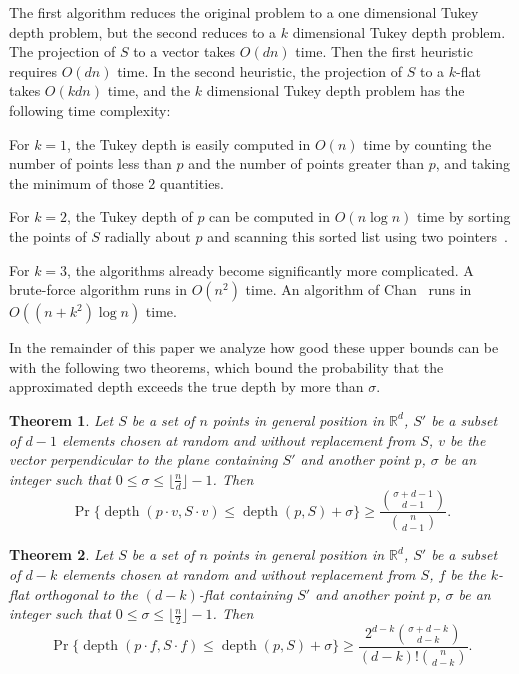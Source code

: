 \documentclass{patmorin}
\newtheorem{theorem}{Theorem}%
\DeclareMathOperator{\depth}{depth}
\begin{document}
The first algorithm reduces the original problem to a one dimensional Tukey depth problem, but the second reduces to a $k$ dimensional Tukey depth problem. The projection of $S$ to a vector takes $O(dn)$ time. Then the first heuristic requires $O(dn)$ time. In the second heuristic, the projection of $S$ to a $k$-flat takes $O(kdn)$ time, and the $k$ dimensional Tukey depth problem has the following time complexity:

For $k = 1$, the Tukey depth is easily computed in $O(n)$ time by counting the number of points less than $p$ and the number of points greater than $p$, and taking the minimum of those $2$ quantities.

For $k = 2$, the Tukey depth of $p$ can be computed in $O(n\log n)$ time by sorting the points of $S$ radially about $p$ and scanning this sorted list using two pointers~\cite{Rousseeuw98}.

For $k = 3$, the algorithms already become significantly more complicated. A brute-force algorithm runs in $O(n^{2})$ time. An algorithm of Chan~\cite{Chan05} runs in $O((n + k^{2})\log n)$ time.

In the remainder of this paper we analyze how good these upper bounds can be with the following two theorems, which bound the probability that the approximated depth exceeds the true depth by more than $\sigma$.
\begin{theorem}
\label{thm:ballofvertices}
  Let $S$ be a set of $n$ points in general position in $\mathbb{R}^{d}$, $S'$ be a subset of $d-1$ elements chosen at random and without replacement from $S$, $v$ be the vector perpendicular to the plane containing $S'$ and another point $p$, $\sigma$ be an integer such that $0 \leq \sigma \leq \lfloor \frac{n}{d}\rfloor - 1$. Then
\[ \Pr\{ \depth{(p \cdot v, S \cdot v)} \leq \depth{(p, S)} + \sigma \} \geq \frac{\binom{\sigma+d-1}{d-1}}{\binom{n}{d-1}}.\]
\end{theorem}
\begin{theorem}
\label{thm:ballofflats}
  Let $S$ be a set of $n$ points in general position in $\mathbb{R}^{d}$, $S'$ be a subset of $d-k$ elements chosen at random and without replacement from $S$, $f$ be the $k$-flat orthogonal to the $(d - k)$-flat containing $S'$ and another point $p$, $\sigma$ be an integer such that $0 \leq \sigma \leq \lfloor \frac{n}{2}\rfloor - 1$. Then
\[ \Pr\{ \depth{(p \cdot f, S \cdot f)} \leq \depth{(p, S)} + \sigma \} \geq \frac{2^{d-k}\binom{\sigma + d-k}{d-k}}{(d-k)!\binom{n}{d-k}}.\]
\end{theorem}
\end{document}

